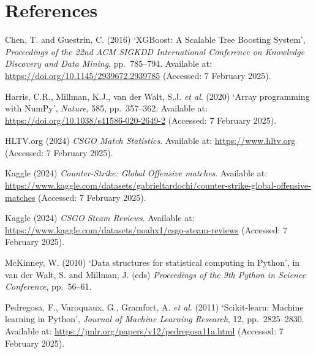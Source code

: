 \documentclass[12pt,a4paper]{article}
\begin{document}
\section{References}

\begin{list}{}{%
  \setlength{\leftmargin}{2em}%
  \setlength{\itemindent}{-2em}%
  \setlength{\itemsep}{0.75em}%
  \setlength{\parsep}{0pt}}

\item Chen, T. and Guestrin, C. (2016) `XGBoost: A Scalable Tree Boosting System', \textit{Proceedings of the 22nd ACM SIGKDD International Conference on Knowledge Discovery and Data Mining}, pp.\ 785--794. Available at: \url{https://doi.org/10.1145/2939672.2939785} (Accessed: 7 February 2025).

\item Harris, C.R., Millman, K.J., van der Walt, S.J. \textit{et al}. (2020) `Array programming with NumPy', \textit{Nature}, 585, pp.\ 357--362. Available at: \url{https://doi.org/10.1038/s41586-020-2649-2} (Accessed: 7 February 2025).

\item HLTV.org (2024) \textit{CSGO Match Statistics}. Available at: \url{https://www.hltv.org} (Accessed: 7 February 2025).

\item Kaggle (2024) \textit{Counter-Strike: Global Offensive matches}. Available at: \url{https://www.kaggle.com/datasets/gabrieltardochi/counter-strike-global-offensive-matches} (Accessed: 7 February 2025).

\item Kaggle (2024) \textit{CSGO Steam Reviews}. Available at: \url{https://www.kaggle.com/datasets/noahx1/csgo-steam-reviews} (Accessed: 7 February 2025).

\item McKinney, W. (2010) `Data structures for statistical computing in Python', in van der Walt, S. and Millman, J. (eds) \textit{Proceedings of the 9th Python in Science Conference}, pp.\ 56--61.

\item Pedregosa, F., Varoquaux, G., Gramfort, A. \textit{et al}. (2011) `Scikit-learn: Machine learning in Python', \textit{Journal of Machine Learning Research}, 12, pp.\ 2825--2830. Available at: \url{https://jmlr.org/papers/v12/pedregosa11a.html} (Accessed: 7 February 2025).

\end{list}

\end{document}
